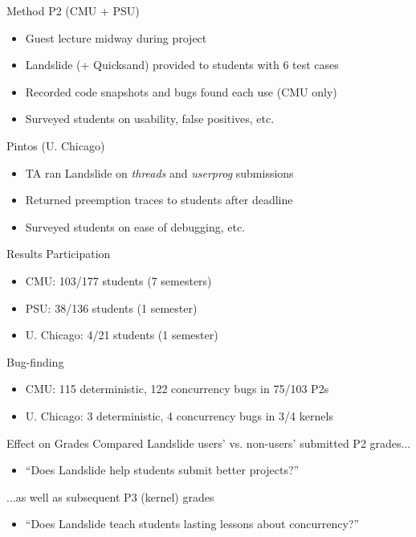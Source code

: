 \documentclass[xcolor=dvipsnames]{beamer}
\begin{document}

\begin{frame}{Method}
	P2 (CMU + PSU)
	\begin{itemize}
		\item Guest lecture midway during project
		\item Landslide (+ Quicksand) provided to students with 6 test cases %
		\item Recorded code snapshots and bugs found each use (CMU only)
		\item Surveyed students on usability, false positives, etc.
	\end{itemize}
	\pause
	\linegap

	Pintos (U. Chicago)
	\begin{itemize}
		\item TA %
			ran Landslide on {\em threads} and {\em userprog} submissions
		\item Returned preemption traces to students after deadline
		\item Surveyed students on ease of debugging, etc.
	\end{itemize}
\end{frame}

\begin{frame}{Results}
	Participation
	\begin{itemize}
		\item CMU: 103/177 students (7 semesters)
		\item PSU: 38/136 students (1 semester)
		\item U. Chicago: 4/21 students (1 semester)
	\end{itemize}
	\linegap

	Bug-finding
	\begin{itemize}
		\item CMU: 115 deterministic, 122 concurrency bugs in 75/103 P2s
		\item U. Chicago: 3 deterministic, 4 concurrency bugs in 3/4 kernels
	\end{itemize}
\end{frame}

\begin{frame}{Effect on Grades}
	Compared Landslide users' vs. non-users' submitted P2 grades...
	\begin{itemize}
		\item ``Does Landslide help students submit better projects?''
	\end{itemize}
	\linegap

	...as well as subsequent P3 (kernel) grades
	\begin{itemize}
		\item ``Does Landslide teach students lasting lessons about concurrency?''
	\end{itemize}
\end{frame}
\end{document}
